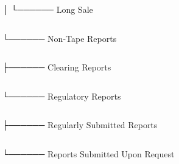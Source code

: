 \documentclass[11pt]{article}
\begin{document}
│           └────── Long Sale
\begin{center}
\begin{tabular}{}
\\[0pt]
\end{tabular}
\end{center}
└────── Non-Tape Reports
\begin{center}
\begin{tabular}{}
\\[0pt]
\end{tabular}
\end{center}
├────── Clearing Reports
\begin{center}
\begin{tabular}{}
\\[0pt]
\end{tabular}
\end{center}
└────── Regulatory Reports
\begin{center}
\begin{tabular}{}
\\[0pt]
\end{tabular}
\end{center}
├────── Regularly Submitted Reports
\begin{center}
\begin{tabular}{}
\\[0pt]
\end{tabular}
\end{center}
└────── Reports Submitted Upon Request
\end{document}
